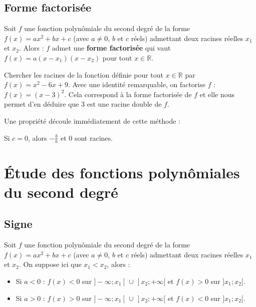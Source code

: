 	\subsection{Forme factorisée}

	\begin{formula}[Définition]
		Soit $f$ une fonction polynômiale du second degré de la forme $f(x) = ax^2 + bx +c$ (avec $a \neq 0$, $b$ et $c$ réels) admettant deux racines réelles $x_1$ et $x_2$. Alors :
		\newpar
		$f$ admet une \textbf{forme factorisée} qui vaut $f(x) = a(x-x_1)(x-x_2)$ pour tout $x \in \mathbb{R}$.
	\end{formula}

	\begin{tip}[Exemple]
		Chercher les racines de la fonction définie pour tout $x \in \mathbb{R}$ par $f(x) = x^2 - 6x + 9$.
		\newpar
		Avec une identité remarquable, on factorise $f$ : $f(x) = (x - 3)^2$.
		\newpar
		Cela correspond à la forme factorisée de $f$ et elle nous permet d'en déduire que $3$ est une racine double de $f$.
	\end{tip}

	Une propriété découle immédiatement de cette méthode :

	\begin{formula}[Propriété]
		Si $c = 0$, alors $-\frac{b}{a}$ et $0$ sont racines.
	\end{formula}

	\section{Étude des fonctions polynômiales du second degré}

	\subsection{Signe}

	\begin{formula}
		Soit $f$ une fonction polynômiale du second degré de la forme $f(x) = ax^2 + bx +c$ (avec $a \neq 0$, $b$ et $c$ réels) admettant deux racines réelles $x_1$ et $x_2$. On suppose ici que $x_1 < x_2$, alors :
		\begin{itemize}
			\item Si $a < 0$ : $f(x) < 0$ sur $]-\infty; x_1[ \, \cup \, ]x_2; +\infty[$ et $f(x) > 0$ sur $]x_1; x_2[$.
			\item Si $a > 0$ : $f(x) > 0$ sur $]-\infty; x_1[ \, \cup \, ]x_2; +\infty[$ et $f(x) < 0$ sur $]x_1; x_2[$.
		\end{itemize}
	\end{formula}

